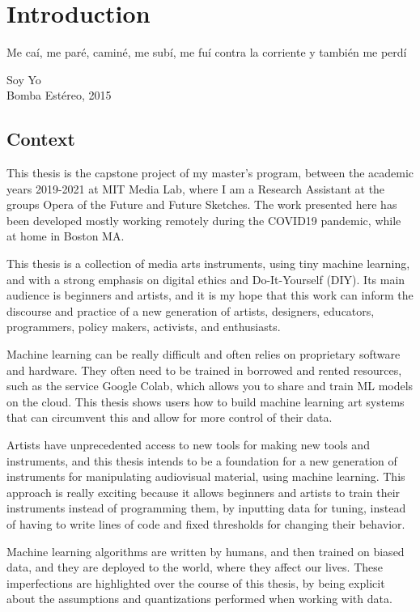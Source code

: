 \chapter{Introduction}

\epigraph{Me caí, me paré, caminé, me subí, me fuí contra la corriente y también me perdí}{Soy Yo \\ Bomba Estéreo, 2015}

\section{Context}

This thesis is the capstone project of my master's program, between the academic years 2019-2021 at MIT Media Lab, where I am a Research Assistant at the groups Opera of the Future and Future Sketches. The work presented here has been developed mostly working remotely during the COVID19 pandemic, while at home in Boston MA.

This thesis is a collection of media arts instruments, using tiny machine learning, and with a strong emphasis on digital ethics and Do-It-Yourself (DIY). Its main audience is beginners and artists, and it is my hope that this work can inform the discourse and practice of a new generation of artists,  designers, educators, programmers, policy makers, activists, and enthusiasts.

Machine learning can be really difficult and often relies on proprietary software and hardware. They often need to be trained in borrowed and rented resources, such as the service Google Colab, which allows you to share and train ML models on the cloud. This thesis shows users how to build machine learning art systems that can circumvent this and allow for more control of their data.

Artists have unprecedented access to new tools for making new tools and instruments, and this thesis intends to be a foundation for a new generation of instruments for manipulating audiovisual material, using machine learning. This approach is really exciting because it allows beginners and artists to train their instruments instead of programming them, by inputting data for tuning, instead of having to write lines of code and fixed thresholds for changing their behavior.

Machine learning algorithms are written by humans, and then trained on biased data, and they are deployed to the world, where they affect our lives. These imperfections are highlighted over the course of this thesis, by being explicit about the assumptions and quantizations performed when working with data.

